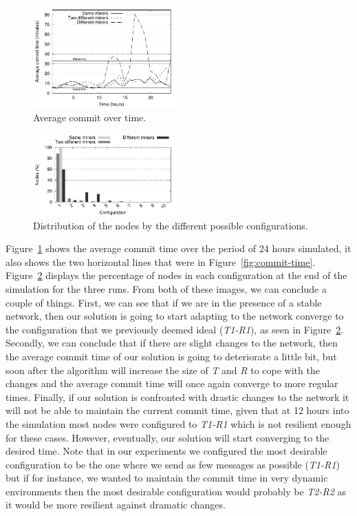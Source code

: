 \documentclass{dads}   %
\begin{document}
\begin{figure}
\centering
\includegraphics[width=0.5\textwidth]{plots/commit_over_time.pdf}
\caption{Average commit over time.}
\label{fig:commit-over-time}
\end{figure}

\begin{figure}
\centering
\includegraphics[width=0.5\textwidth]{plots/nodes_per_config.pdf}
\caption{Distribution of the nodes by the different possible configurations.}
\label{fig:node-per-conf}
\end{figure}

Figure~\ref{fig:commit-over-time} shows the average commit time over the period of 24 hours simulated, it also shows the two horizontal lines that were in Figure~\ref{fig:commit-time}. Figure~\ref{fig:node-per-conf} displays the percentage of nodes in each configuration at the end of the simulation for the three runs. From both of these images, we can conclude a couple of things. First, we can see that if we are in the presence of a stable network, then our solution is going to start adapting to the network converge to the configuration that we previously deemed ideal (\textsl{T1-R1}), as seen in Figure~\ref{fig:node-per-conf}. Secondly, we can conclude that if there are slight changes to the network, then the average commit time of our solution is going to deteriorate a little bit, but soon after the algorithm will increase the size of \textsl{T} and \textsl{R} to cope with the changes and the average commit time will once again converge to more regular times. Finally, if our solution is confronted with drastic changes to the network it will not be able to maintain the current commit time, given that at 12 hours into the simulation most nodes were configured to \textsl{T1-R1} which is not resilient enough for these cases. However, eventually, our solution will start converging to the desired time. Note that in our experiments we configured the most desirable configuration to be the one where we send as few messages as possible (\textsl{T1-R1}) but if for instance, we wanted to maintain the commit time in very dynamic environments then the most desirable configuration would probably be \textsl{T2-R2} as it would be more resilient against dramatic changes.
\end{document}
